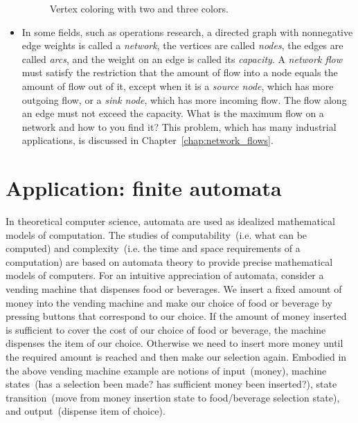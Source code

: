 \begin{itemize}
\begin{figure}[!htbp]
\centering
{}

\caption{Vertex coloring with two and three colors.}
\label{fig:introduction:vertex_coloring}
\end{figure}

\item In some fields, such as operations
  research, a directed graph with nonnegative edge weights is called
  a \emph{network}, the vertices are called
  \emph{nodes}, the edges are called \emph{arcs}, and the weight on an
  edge is called its \emph{capacity}. A
  \emph{network flow} must satisfy the restriction
  that the amount of flow into a node equals the amount of flow out of
  it, except when it is a \emph{source node}, which has more outgoing
  flow, or a \emph{sink node}, which has more incoming flow. The flow
  along an edge must not exceed the capacity. What is the maximum flow
  on a network and how to you find it? This problem, which has many
  industrial applications, is discussed in
  Chapter~\ref{chap:network_flows}.
\end{itemize}



\section{Application: finite automata}

In theoretical computer science, automata are
used as idealized mathematical models of computation. The studies of
computability~(i.e. what can be computed) and complexity~(i.e. the
time and space requirements of a computation) are based on automata
theory to provide precise mathematical models of computers. For an
intuitive appreciation of automata, consider a
vending machine that dispenses food or
beverages. We insert a fixed amount of money into the vending machine
and make our choice of food or beverage by pressing buttons that
correspond to our choice. If the amount of money inserted is
sufficient to cover the cost of our choice of food or beverage, the
machine dispenses the item of our choice. Otherwise we need to insert
more money until the required amount is reached and then make our
selection again. Embodied in the above vending machine example are
notions of input~(money), machine states~(has a selection been made?
has sufficient money been inserted?), state transition~(move from
money insertion state to food/beverage selection state), and
output~(dispense item of choice).

